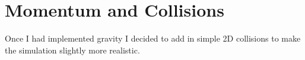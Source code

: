\section{Momentum  and Collisions}
	Once I had implemented gravity I decided to add in simple 2D collisions to make the simulation slightly more realistic.